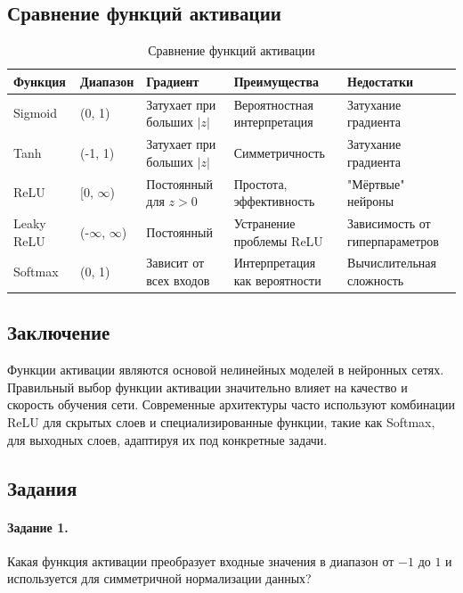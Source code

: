 {\subsection*{Сравнение функций активации}
\begin{table}[h!]
    \centering
    \begin{tabular}{|l|l|l|l|l|}
        \hline
        \textbf{Функция} & \textbf{Диапазон}     & \textbf{Градиент}          & \textbf{Преимущества}         & \textbf{Недостатки}            \\
        \hline
        Sigmoid          & (0, 1)                & Затухает при больших $|z|$ & Вероятностная интерпретация   & Затухание градиента            \\
        \hline
        Tanh             & (-1, 1)               & Затухает при больших $|z|$ & Симметричность                & Затухание градиента            \\
        \hline
        ReLU             & [0, $\infty$)         & Постоянный для $z > 0$     & Простота, эффективность       & "Мёртвые" нейроны              \\
        \hline
        Leaky ReLU       & (-$\infty$, $\infty$) & Постоянный                 & Устранение проблемы ReLU      & Зависимость от гиперпараметров \\
        \hline
        Softmax          & (0, 1)                & Зависит от всех входов     & Интерпретация как вероятности & Вычислительная сложность       \\
        \hline
    \end{tabular}
    \caption{Сравнение функций активации}
\end{table}

\subsection*{Заключение}
Функции активации являются основой нелинейных моделей в нейронных сетях. Правильный выбор функции активации значительно влияет на качество и скорость обучения сети. Современные архитектуры часто используют комбинации ReLU для скрытых слоев и специализированные функции, такие как Softmax, для выходных слоев, адаптируя их под конкретные задачи.

\subsection*{Задания}

\paragraph{Задание 1.} Какая функция активации преобразует входные значения в диапазон от $-1$ до $1$ и используется для симметричной нормализации данных?

}
